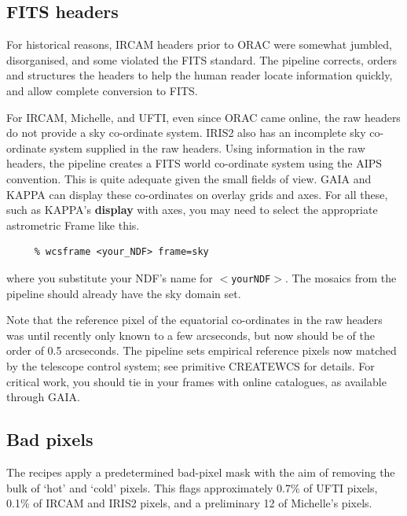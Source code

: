 \documentclass[twoside,11pt]{article}
\newcommand{\htmladdnormallink}[2]{#1}
\newcommand{\xref}[3]{#1}
\newcommand{\xlabel}[1]{}
\renewcommand{\_}{\texttt{\symbol{95}}}
\newcommand{\GAIA}{{\footnotesize GAIA}}
\newcommand{\KAPPA}{{\footnotesize KAPPA}}
\begin{document}
\subsection{\xlabel{fits_headers}FITS headers\label{fits_headers}}

For historical reasons, IRCAM headers prior to ORAC were somewhat
jumbled, disorganised, and some violated the 
\htmladdnormallink{FITS standard}{http://archive.stsci.edu/fits/fits_standard/}.
The pipeline corrects, orders and structures the headers to help
the human reader locate information quickly, and allow complete 
conversion to FITS.

For IRCAM, Michelle, and UFTI, even since ORAC came online, the raw
headers do not provide a sky co-ordinate system.  IRIS2 also has an
incomplete sky co-ordinate system supplied in the raw headers. Using information in
the raw headers, the pipeline creates a FITS world co-ordinate system
using the AIPS convention.  This is quite adequate given the small
fields of view.  \xref{\GAIA}{sun214}{} and \xref{\KAPPA}{sun95}{} can
display these co-ordinates on overlay grids and axes.  For all these,
such as {\KAPPA}'s {\bf display} with axes, you may need to select the
appropriate astrometric Frame like this.

\begin{verbatim}
     % wcsframe <your_NDF> frame=sky
\end{verbatim}
where you substitute your NDF's name for {\tt$<$your\_NDF$>$}.  The
mosaics from the pipeline should already have the sky domain set.

Note that the reference pixel of the equatorial co-ordinates in the
raw headers was until recently only known to a few arcseconds, but now
should be of the order of 0.5 arcseconds.  The pipeline sets empirical
reference pixels now matched by the telescope control system; see
primitive \_CREATE\_WCS\_ for details.  For critical work, you should
tie in your frames with online catalogues, as available through \GAIA.

\subsection{\xlabel{bad_pixels}Bad pixels\label{bad_pixels}}

The recipes apply a predetermined bad-pixel mask with the aim of
removing the bulk of `hot' and `cold' pixels.  This flags
approximately 0.7\% of UFTI pixels, 0.1\% of IRCAM and IRIS2 pixels, and a
preliminary 12 of Michelle's pixels.  
\end{document}
